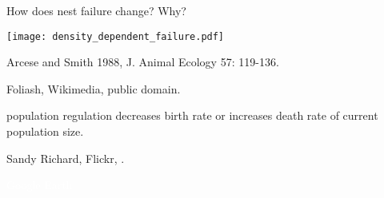 \documentclass[t]{beamer}
\begin{document}
\begin{frame}[b]{How does nest failure change? Why?}
	\begin{center}
		\texttt{[image: density\_dependent\_failure.pdf]}
	\end{center}	

	\tiny Arcese and Smith 1988, J. Animal Ecology 57: 119-136.
\end{frame}


{
\begin{frame}[b]{}
\tiny\textcolor{orange5}{Foliash, Wikimedia, public domain.}
\end{frame}
}

{
\begin{frame}[b]{}
\end{frame}
}


\begin{frame}{}

	\hangpara {} population regulation decreases birth rate or increases death rate  of current population size.
		
\end{frame}

{
\begin{frame}[b]{}
\hfill\tiny Sandy Richard, Flickr, .
\end{frame}
}

{
\begin{frame}[b]

	\hfill \tiny \textcolor{white}{Google Earth}
\end{frame}
}

{
\begin{frame}{}
\end{frame}
}
\end{document}
